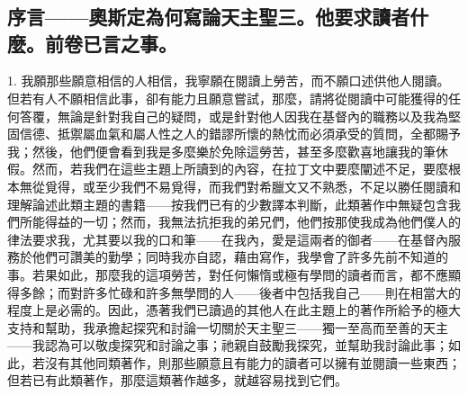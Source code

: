 

\section{}

\par


\subsection{序言——奧斯定為何寫論天主聖三。他要求讀者什麼。前卷已言之事。}

1. 我願那些願意相信的人相信，我寧願在閱讀上勞苦，而不願口述供他人閱讀。但若有人不願相信此事，卻有能力且願意嘗試，那麼，請將從閱讀中可能獲得的任何答覆，無論是針對我自己的疑問，或是針對他人因我在基督內的職務以及我為堅固信德、抵禦屬血氣和屬人性之人的錯謬所懷的熱忱而必須承受的質問，全都賜予我；然後，他們便會看到我是多麼樂於免除這勞苦，甚至多麼歡喜地讓我的筆休假。然而，若我們在這些主題上所讀到的內容，在拉丁文中要麼闡述不足，要麼根本無從覓得，或至少我們不易覓得，而我們對希臘文又不熟悉，不足以勝任閱讀和理解論述此類主題的書籍——按我們已有的少數譯本判斷，此類著作中無疑包含我們所能得益的一切；然而，我無法抗拒我的弟兄們，他們按那使我成為他們僕人的律法要求我，尤其要以我的口和筆——在我內，愛是這兩者的御者——在基督內服務於他們可讚美的勤學；同時我亦自認，藉由寫作，我學會了許多先前不知道的事。若果如此，那麼我的這項勞苦，對任何懶惰或極有學問的讀者而言，都不應顯得多餘；而對許多忙碌和許多無學問的人——後者中包括我自己——則在相當大的程度上是必需的。因此，憑著我們已讀過的其他人在此主題上的著作所給予的極大支持和幫助，我承擔起探究和討論一切關於天主聖三——獨一至高而至善的天主——我認為可以敬虔探究和討論之事；祂親自鼓勵我探究，並幫助我討論此事；如此，若沒有其他同類著作，則那些願意且有能力的讀者可以擁有並閱讀一些東西；但若已有此類著作，那麼這類著作越多，就越容易找到它們。\par

